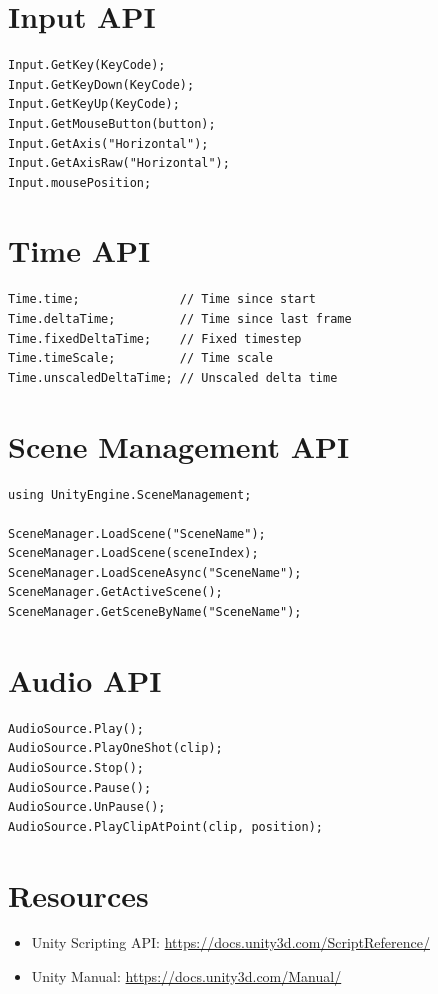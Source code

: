 \section{Input API}

\begin{lstlisting}[language={[Sharp]C}]
Input.GetKey(KeyCode);
Input.GetKeyDown(KeyCode);
Input.GetKeyUp(KeyCode);
Input.GetMouseButton(button);
Input.GetAxis("Horizontal");
Input.GetAxisRaw("Horizontal");
Input.mousePosition;
\end{lstlisting}

\section{Time API}

\begin{lstlisting}[language={[Sharp]C}]
Time.time;              // Time since start
Time.deltaTime;         // Time since last frame
Time.fixedDeltaTime;    // Fixed timestep
Time.timeScale;         // Time scale
Time.unscaledDeltaTime; // Unscaled delta time
\end{lstlisting}

\section{Scene Management API}

\begin{lstlisting}[language={[Sharp]C}]
using UnityEngine.SceneManagement;

SceneManager.LoadScene("SceneName");
SceneManager.LoadScene(sceneIndex);
SceneManager.LoadSceneAsync("SceneName");
SceneManager.GetActiveScene();
SceneManager.GetSceneByName("SceneName");
\end{lstlisting}

\section{Audio API}

\begin{lstlisting}[language={[Sharp]C}]
AudioSource.Play();
AudioSource.PlayOneShot(clip);
AudioSource.Stop();
AudioSource.Pause();
AudioSource.UnPause();
AudioSource.PlayClipAtPoint(clip, position);
\end{lstlisting}

\section{Resources}

\begin{itemize}
\item Unity Scripting API: \url{https://docs.unity3d.com/ScriptReference/}
\item Unity Manual: \url{https://docs.unity3d.com/Manual/}
\end{itemize}
